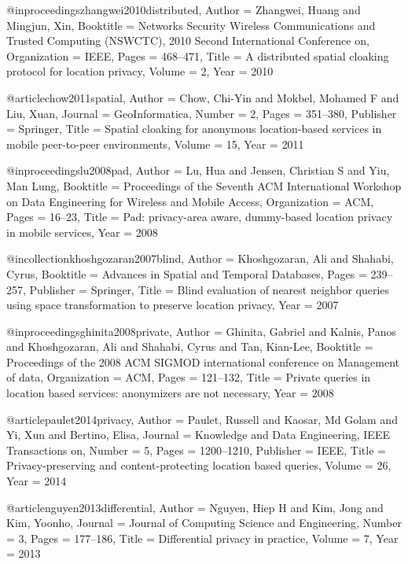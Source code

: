 {{{{{	@inproceedings{zhangwei2010distributed,
	Author = {Zhangwei, Huang and Mingjun, Xin},
	Booktitle = {Networks Security Wireless Communications and Trusted Computing (NSWCTC), 2010 Second International Conference on},
	Organization = {IEEE},
	Pages = {468--471},
	Title = {A distributed spatial cloaking protocol for location privacy},
	Volume = {2},
	Year = {2010}}
	
	@article{chow2011spatial,
	Author = {Chow, Chi-Yin and Mokbel, Mohamed F and Liu, Xuan},
	Journal = {GeoInformatica},
	Number = {2},
	Pages = {351--380},
	Publisher = {Springer},
	Title = {Spatial cloaking for anonymous location-based services in mobile peer-to-peer environments},
	Volume = {15},
	Year = {2011}}
	
	@inproceedings{lu2008pad,
	Author = {Lu, Hua and Jensen, Christian S and Yiu, Man Lung},
	Booktitle = {Proceedings of the Seventh ACM International Workshop on Data Engineering for Wireless and Mobile Access},
	Organization = {ACM},
	Pages = {16--23},
	Title = {Pad: privacy-area aware, dummy-based location privacy in mobile services},
	Year = {2008}}
	
	@incollection{khoshgozaran2007blind,
	Author = {Khoshgozaran, Ali and Shahabi, Cyrus},
	Booktitle = {Advances in Spatial and Temporal Databases},
	Pages = {239--257},
	Publisher = {Springer},
	Title = {Blind evaluation of nearest neighbor queries using space transformation to preserve location privacy},
	Year = {2007}}
	
	@inproceedings{ghinita2008private,
	Author = {Ghinita, Gabriel and Kalnis, Panos and Khoshgozaran, Ali and Shahabi, Cyrus and Tan, Kian-Lee},
	Booktitle = {Proceedings of the 2008 ACM SIGMOD international conference on Management of data},
	Organization = {ACM},
	Pages = {121--132},
	Title = {Private queries in location based services: anonymizers are not necessary},
	Year = {2008}}
	
	@article{paulet2014privacy,
	Author = {Paulet, Russell and Kaosar, Md Golam and Yi, Xun and Bertino, Elisa},
	Journal = {Knowledge and Data Engineering, IEEE Transactions on},
	Number = {5},
	Pages = {1200--1210},
	Publisher = {IEEE},
	Title = {Privacy-preserving and content-protecting location based queries},
	Volume = {26},
	Year = {2014}}
	
	@article{nguyen2013differential,
	Author = {Nguyen, Hiep H and Kim, Jong and Kim, Yoonho},
	Journal = {Journal of Computing Science and Engineering},
	Number = {3},
	Pages = {177--186},
	Title = {Differential privacy in practice},
	Volume = {7},
	Year = {2013}}
	
}}}}}
